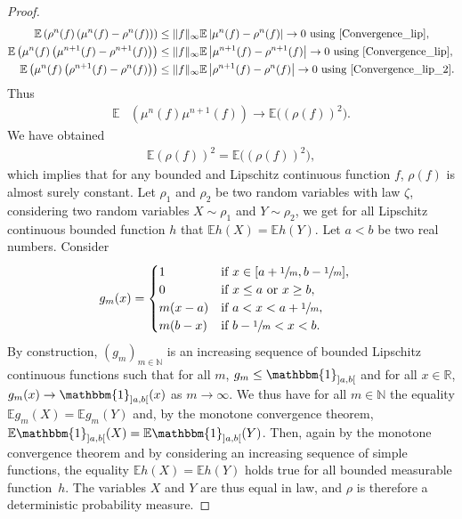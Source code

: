 \documentclass[JEP,XML,SOM,Unicode,published]{cedram}
\let\mathds\mathbbm
\theoremstyle{plain}
\theoremstyle{definition}
\begin{document}
\begin{proof}
\begin{align*}
\mathbb{E}\left(\rho^n(f)\left(\mu^n(f)-\rho^n(f)\right)\right)&\leq \|f\|_{\infty}\mathbb{E}\left|\mu^n(f)-\rho^n(f)\right|\to0\text{ using \eqref{Convergence_lip}},\\
\mathbb{E}\left(\mu^n(f)\left(\mu^{n+1}(f)-\rho^{n+1}(f)\right)\right)&\leq \|f\|_{\infty}\mathbb{E}\left|\mu^{n+1}(f)-\rho^{n+1}(f)\right|\to0\text{ using \eqref{Convergence_lip}},\\
\mathbb{E}\left(\mu^n(f)\left(\rho^{n+1}(f)-\rho^{n}(f)\right)\right)&\leq \|f\|_{\infty}\mathbb{E}\left|\rho^{n+1}(f)-\rho^{n}(f)\right|\to0\text{ using \eqref{Convergence_lip_2}}.
\end{align*}
Thus
\begin{align*}
\mathbb{E}&\left(\mu^{n}(f)\mu^{n+1}(f)\right)\to\mathbb{E}\bigl(\left(\rho(f)\right)^2\bigr).
\end{align*}
We have obtained
\begin{align*}
\mathbb{E}\left(\rho(f)\right)^2=\mathbb{E}\bigl(\left(\rho(f)\right)^2\bigr),
\end{align*}
which implies that for any bounded and Lipschitz continuous function $f$, $\rho(f)$ is almost surely constant. Let $\rho_1$ and $\rho_2$ be two random variables with law $\zeta$, considering two random variables $X\sim\rho_1$ and $Y\sim\rho_2$, we get for all Lipschitz continuous bounded function $h$ that $\mathbb{E}h(X)=\mathbb{E}h(Y)$. Let $a<b$ be two real numbers. Consider
\begin{align*}
g_m(x)&=\begin{cases}
1 &\text{if }x\in[a+\sfrac{1}{m},b-\sfrac{1}{m}],\\
0 &\text{if }x\leq a\text{ or }x\geq b,\\
m(x-a)&\text{if }a<x<a+\sfrac{1}{m},\\
m(b-x)&\text{if }b-\sfrac{1}{m}<x<b.
\end{cases}
\end{align*}
By construction, $(g_m)_{m\in\mathbb{N}}$ is an increasing sequence of bounded Lipschitz continuous functions such that for all $m$, $g_m\leq\mathds{1}_{]a,b[}$ and for all $x\in\mathbb{R}$, $g_m(x)\to\mathds{1}_{]a,b[}(x)$ as $m\to\infty$. We thus have for all $m\in\mathbb{N}$ the equality $\mathbb{E}g_m(X)=\mathbb{E}g_m(Y)$ and, by the monotone convergence theorem, $\mathbb{E}\mathds{1}_{]a,b[}(X)=\mathbb{E}\mathds{1}_{]a,b[}(Y)$. Then, again by the monotone convergence theorem and by considering an increasing sequence of simple functions, the equality $\mathbb{E}h(X)=\mathbb{E}h(Y)$ holds true for all bounded measurable function~$h$. The variables $X$ and $Y$ are thus equal in law, and $\rho$ is therefore a deterministic probability measure.
\end{proof}
\end{document}
